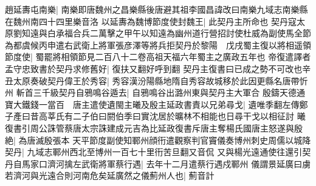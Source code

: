 趙延夀屯南樂|{
	南樂即唐魏州之昌樂縣後唐避其祖李國昌諱改曰南樂九域志南樂縣在魏州南四十四里樂音洛}
以延夀為魏博節度使封魏王|{
	此契丹主所命也}
契丹寇太原劉知遠與白承福合兵二萬擊之甲午以知遠為幽州道行營招討使杜威為副使馬全節為都虞候丙申遣右武衛上將軍張彦澤等將兵拒契丹於黎陽　戊戌蜀主復以將相遥領節度使|{
	蜀罷將相領節見二百八十二卷高祖天福六年蜀主之廣政五年也}
帝復遣譯者孟守忠致書於契丹求修舊好|{
	復扶又翻好呼到翻}
契丹主復書曰已成之勢不可改也辛丑太原奏破契丹偉王於秀容|{
	秀容漢汾陽縣地隋自秀容故城移於此因更縣名唐帶忻州}
斬首三千級契丹自鴉鳴谷遁去|{
	自鴉鳴谷出潞州東與契丹主大軍合}
殷鑄天德通寶大鐵錢一當百　唐主遣使遺閩主曦及殷主延政書責以兄弟尋戈|{
	遺唯季翻左傳鄭子產曰昔高莘氏有二子伯曰閼伯季曰實沈居於曠林不相能也日尋干戈以相征討}
曦復書引周公誅管蔡唐太宗誅建成元吉為比延政復書斥唐主奪楊氏國唐主怒遂與殷絶|{
	為唐滅殷張本}
天平節度副使知鄆州顔衎遣觀察判官竇儀奏博州刺史周儒以城降契丹|{
	九域志鄆州西北至博州一百七十里衎苦旦翻又音侃}
又與楊光遠通使往還引契丹自馬家口濟河擒左武衛將軍蔡行遇|{
	去年十二月遣蔡行遇戍鄆州}
儀謂景延廣曰虜若濟河與光遠合則河南危矣延廣然之儀薊州人也|{
	薊音計}


